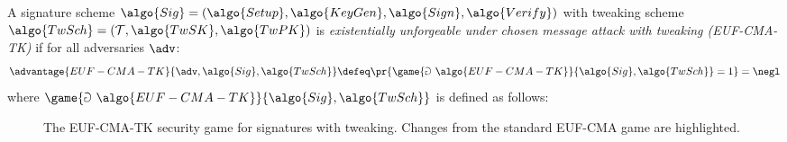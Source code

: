 \ifsolutions
\begin{mysolution}
  A signature scheme $\algo{Sig} = (\algo{Setup}, \algo{KeyGen}, \algo{Sign}, \algo{Verify})$ with tweaking scheme $\algo{TwSch} = (\mathcal{T}, \algo{TwSK}, \algo{TwPK})$ is \emph{existentially unforgeable under chosen message attack with tweaking (EUF-CMA-TK)} if for all \ppt adversaries $\adv$:
  \[
    \advantage{EUF-CMA-TK}{\adv, \algo{Sig}, \algo{TwSch}} \defeq \pr{\game{\Game~\algo{EUF-CMA-TK}}{\algo{Sig}, \algo{TwSch}} = 1} = \negl
  \]
  where $\game{\Game~\algo{EUF-CMA-TK}}{\algo{Sig}, \algo{TwSch}}$ is defined as follows:

  \begin{figure}[htb]
    \begin{center}
      \begin{tcolorbox}
        \begin{pchstack}[center]
          \pchspace
        \end{pchstack}
      \end{tcolorbox}
    \end{center}
    \caption{The EUF-CMA-TK security game for signatures with tweaking. Changes from the standard EUF-CMA game are highlighted.}
    \label{fig:euf-cma-tk}
  \end{figure}
\end{mysolution}
\fi

